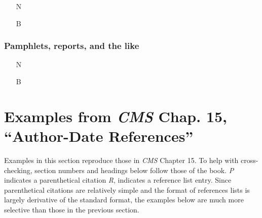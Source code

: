\documentclass[11pt,letterpaper,oneside]{article}
\begin{document}
\begin{itemize}
\item[N] 

\item[B] 
\end{itemize}




\setcounter{subsubsection}{248}
\subsubsection{Pamphlets, reports, and the like}

\begin{itemize}
\item[N] 

\item[B] 
\end{itemize}

\section{Examples from \emph{CMS} Chap. 15, ``Author-Date
References''}
\label{paren16}

Examples in this section reproduce those in \textit{CMS} Chapter 15.
To help with cross-checking, section numbers and headings below follow
those of the book. \textit{P} indicates a parenthetical citation
\textit{R}, indicates a reference list entry. Since parenthetical
citations are relatively simple and the format of references lists is
largely derivative of the standard format, the examples below are much
more selective than those in the previous section.
\end{document}
